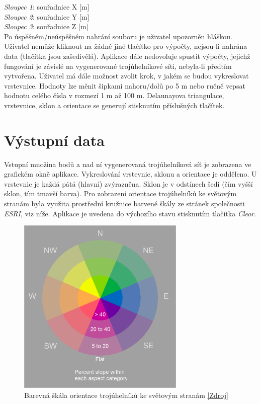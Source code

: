 \documentclass[a4paper, 12pt]{article}
\begin{document}
\noindent
\textit{Sloupec 1}: souřadnice X [m]\\
\textit{Sloupec 2}: souřadnice Y [m]\\
\textit{Sloupec 3}: souřadnice Z [m]\\

Po úspěšném/neúspěšném nahrání souboru je uživatel upozorněn hláškou. Uživatel nemůže kliknout na žádné jiné tlačítko pro výpočty, nejsou-li nahrána data (tlačítka jsou zašedivělá). Aplikace dále nedovoluje spustit výpočty, jejichž fungování je závislé na vygenerované trojúhelníkové síti, nebyla-li předtím vytvořena. Uživatel má dále možnost zvolit krok, v jakém se budou vykreslovat vrstevnice. Hodnoty lze měnit šipkami nahoru/dolů po 5 m nebo ručně vepsat hodnotu celého čísla v rozmezí 1 m až 100 m. Delaunayova triangulace, vrstevnice, sklon a orientace se generují stisknutím příslušných tlačítek.

\section{Výstupní data}
Vstupní množina bodů a nad ní vygenerovaná trojúhelníková síť je zobrazena ve grafickém okně aplikace. Vykreslování vrstevnic, sklonu a orientace je odděleno. U vrstevnic je každá pátá (hlavní) zvýrazněna. Sklon je v odstínech šedi (čím vyšší sklon, tím tmavší barva). Pro zobrazení orientace trojúhelníků ke světovým stranám byla využita prostřední kružnice barvené škály ze stránek společnosti \textit{ESRI}, viz níže. Aplikace je uvedena do výchozího stavu stisknutím tlačítka \textsl{Clear}.\\

\begin{figure}[h!]
	\centering
	\includegraphics[width=8cm]{./pictures/skala.png}
	\caption{Barevná škála orientace trojúhelníků ke světovým stranám \href{https://www.esri.com/arcgis-blog/products/arcgis-pro/imagery/new-aspect-slope-raster-function-now-available/?fbclid=IwAR0LX-HblA_iPSqg19aUKDW096LjaShp9r_ql8QwA_OJ26EkcFTpOEWJrlg}{[Zdroj]}}
\end{figure}
\end{document}
